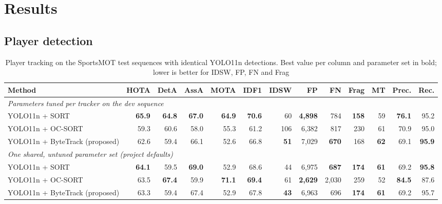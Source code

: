 \documentclass[conference]{IEEEtran}
\begin{document}
\section{Results}
\subsection{Player detection}

\begin{table}[!t]
\caption{Player tracking on the SportsMOT test sequences with identical YOLO11n
detections. Best value per column and parameter set in bold; lower is better for
IDSW, FP, FN and Frag}
\label{tab:sportsmot}
\centering
\footnotesize
\begin{adjustbox}{max width=\textwidth}
\begin{tabular}{@{}lrrrrrrrrrrrr@{}}
\toprule
Method & HOTA & DetA & AssA & MOTA & IDF1 & IDSW & FP & FN & Frag & MT & Prec. & Rec. \\
\midrule
\multicolumn{13}{l}{\textit{Parameters tuned per tracker on the dev sequence}} \\
YOLO11n + SORT & \textbf{65.9} & \textbf{64.8} & \textbf{67.0} & \textbf{64.9} & \textbf{70.6} & 60 & \textbf{4{,}898} & 784 & \textbf{158} & 59 & \textbf{76.1} & 95.2 \\
YOLO11n + OC-SORT & 59.3 & 60.6 & 58.0 & 55.3 & 61.2 & 106 & 6{,}382 & 817 & 230 & 61 & 70.9 & 95.0 \\
YOLO11n + ByteTrack (proposed) & 62.6 & 59.4 & 66.1 & 52.6 & 66.8 & \textbf{51} & 7{,}029 & \textbf{670} & 168 & \textbf{62} & 69.1 & \textbf{95.9} \\
\midrule
\multicolumn{13}{l}{\textit{One shared, untuned parameter set (project defaults)}} \\
YOLO11n + SORT & \textbf{64.1} & 59.5 & \textbf{69.0} & 52.9 & 68.6 & 44 & 6{,}975 & \textbf{687} & \textbf{174} & \textbf{61} & 69.2 & \textbf{95.8} \\
YOLO11n + OC-SORT & 63.5 & \textbf{67.4} & 59.9 & \textbf{71.1} & \textbf{69.4} & 61 & \textbf{2{,}629} & 2{,}030 & 259 & 52 & \textbf{84.5} & 87.6 \\
YOLO11n + ByteTrack (proposed) & 63.3 & 59.4 & 67.4 & 52.9 & 67.8 & \textbf{43} & 6{,}963 & 696 & \textbf{174} & \textbf{61} & 69.2 & 95.7 \\
\bottomrule
\end{tabular}
\end{adjustbox}
\end{table}
\end{document}
